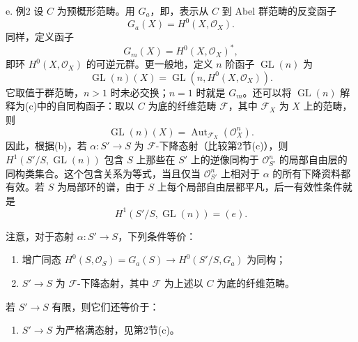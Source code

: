 \begin{statement}{e. 例2}
设 $C$ 为预概形范畴。用 $G_a$，即，表示从 $C$ 到 Abel 群范畴的反变函子
\[
G_a(X)=H^0(X,\mathcal O_X).
\]
同样，定义函子
\[
G_m(X)=H^0(X,\mathcal O_X)^*,
\]
即环 $H^0(X,\mathcal O_X)$ 的可逆元群。更一般地，定义 $n$ 阶函子 $\operatorname{GL}(n)$ 为
\[
\operatorname{GL}(n)(X)=\operatorname{GL}(n,H^0(X,\mathcal O_X)).
\]
它取值于群范畴，$n>1$ 时未必交换；$n=1$ 时就是 $G_m$。还可以将 $\operatorname{GL}(n)$ 解释为(c)中的自同构函子：取以 $C$ 为底的纤维范畴 $\mathcal F$，其中 $\mathcal F_X$ 为 $X$ 上的范畴，则
\[
\operatorname{GL}(n)(X)=\operatorname{Aut}_{\mathcal F_X}(\mathcal O_X^n).
\]
因此，根据(b)，若 $\alpha:S'\to S$ 为 $\mathcal F$-下降态射（比较第2节(c)），则 $H^1(S'/S,\operatorname{GL}(n))$ 包含 $S$ 上那些在 $S'$ 上的逆像同构于 $\mathcal O_{S'}^n$ 的局部自由层的同构类集合。这个包含关系为等式，当且仅当 $\mathcal O_{S'}^n$ 上相对于 $\alpha$ 的所有下降资料都有效。若 $S$ 为局部环的谱，由于 $S$ 上每个局部自由层都平凡，后一有效性条件就是
\[
H^1(S'/S,\operatorname{GL}(n))=(e).
\]

注意，对于态射 $\alpha:S'\to S$，下列条件等价：
\begin{enumerate}[label=(\roman*)]
\item 增广同态 $H^0(S,\mathcal O_S)=G_a(S)\to H^0(S'/S,G_a)$ 为同构；
\item $S'\to S$ 为 $\mathcal F$-下降态射，其中 $\mathcal F$ 为上述以 $C$ 为底的纤维范畴。
\end{enumerate}
若 $S'\to S$ 有限，则它们还等价于：
\begin{enumerate}[label=(\roman*),start=3]
\item $S'\to S$ 为严格满态射，见第2节(c)。
\end{enumerate}


\end{statement}
